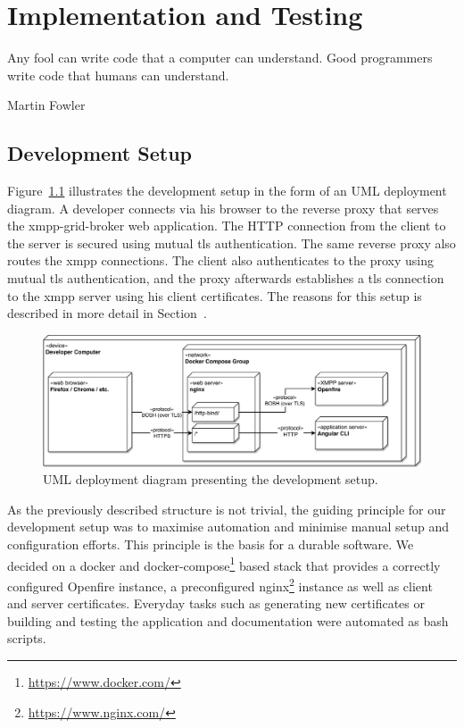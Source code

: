 \chapter{Implementation and Testing} %
\epigraph{Any fool can write code that a computer can understand. Good programmers write code that humans can understand.}{Martin Fowler}


\section{Development Setup}\label{sec:development-setup}

Figure~\ref{fig:development-setup} illustrates the development setup in the form of an UML deployment diagram.
A developer connects via his browser to the reverse proxy that serves the \gls{xmpp-grid-broker} web application.
The HTTP connection from the client to the server is secured using mutual \gls{tls} authentication.
The same reverse proxy also routes the \gls{xmpp} connections.
The client also authenticates to the proxy using mutual \gls{tls} authentication, and the proxy afterwards establishes a \gls{tls} connection to the \gls{xmpp} server using his client certificates.
The reasons for this setup is described in more detail in Section~.

\begin{figure}[h]
    \centering
    \includegraphics[width=1\linewidth]{resources/development-setup-uml}
    \caption{UML deployment diagram presenting the development setup.}
    \label{fig:development-setup}
\end{figure}

As the previously described structure is not trivial, the guiding principle for our development setup was to maximise automation and minimise manual setup and configuration efforts. This principle is the basis for a durable software.
We decided on a docker and docker-compose\footnote{\url{https://www.docker.com/}} based stack that provides a correctly configured Openfire instance, a preconfigured nginx\footnote{\url{https://www.nginx.com/}} instance as well as client and server certificates.
Everyday tasks such as generating new certificates or building and testing the application and documentation were automated as bash scripts.

